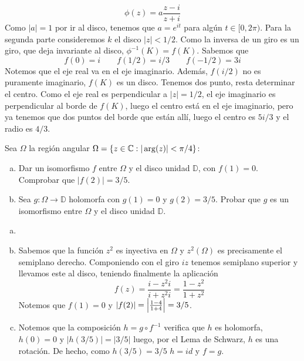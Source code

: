 \documentclass[twoside]{article}
\begin{document}
\begin{solucion}
$$
\phi(z) = a \frac{z-i}{z+i}
$$
Como $|a| = 1$ por ir al disco, tenemos que $a = e^{it}$ para algún $t \in [0,2\pi)$.
\newline
Para la segunda parte consideremos $k$ el disco $|z|<1/2$. Como la inversa de un giro es un giro, que deja invariante al disco, $\phi^{-1}(K)=f(K)$. Sabemos que
$$
f(0) =i \qquad f(1/2)=i/3 \qquad f(-1/2) = 3i
$$
Notemos que el eje real va en el eje imaginario. Además, $f(i/2)$ no es puramente imaginario, $f(K)$ es un disco. Tenemos dos punto, resta determinar el centro. Como el eje real es perpendicular a $|z|=1/2$, el eje imaginario es perpendicular al borde de $f(K)$, luego el centro está en el eje imaginario, pero ya tenemos que dos puntos del borde que están allí, luego el centro es $5i/3$ y el radio es $4/3$.
\end{solucion}

\newpage
\begin{ejercicio}{8}
Sea $\Omega$ la región angular $\Omega=\{ z\in \mathbb{C} : |\arg(z)| < \pi /4 \}$:
\begin{enumerate}[a)]
\item Dar un isomorfismo $f$ entre $\Omega $ y el disco unidad $\mathbb{D}$, con $f(1)=0$.
Comprobar que $|f(2)|=3/5$.
\item  Sea $g\colon \Omega\to \mathbb{D}$ holomorfa con $g(1)=0$ y  $g(2)=3/5$. Probar que $g$ es un 
isomorfismo entre $\Omega $ y el disco unidad $\mathbb{D}$.
\end{enumerate}
\end{ejercicio}
\begin{solucion}
\begin{enumerate}[a)]
\item[]
\item Sabemos que la función $z^2$ es inyectiva en $\Omega$ y $z^2(\Omega)$ es precisamente el semiplano derecho. Componiendo con el giro $iz$ tenemos semiplano superior y llevamos este al disco, teniendo finalmente la aplicación
$$
f(z) = \frac{i-z^2i}{i+z^2i} = \frac{1-z^2}{1+z^2}
$$
Notemos que $f(1)=0$ y $|f(2)|= \left\lvert\frac{1-4}{1+4}\right\rvert = 3/5$.
\item Notemos que la composición $h = g \circ  f^{-1}$ verifica que $h$ es holomorfa, $h(0)=0$ y $|h(3/5)| = |3/5|$ luego, por el Lema de Schwarz, $h$ es una rotación. De hecho, como $h(3/5)=3/5$ $h=id$ y $f=g$.
\end{enumerate}
\end{solucion}

\newpage
\end{document}
